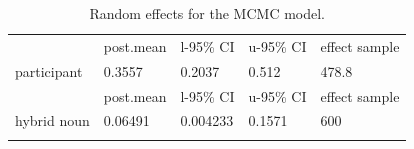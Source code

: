 \documentclass[output=paper,
modfonts,
newtxmath,
hidelinks
]{langscibook}
\begin{document}
\begin{table}[h]
\centering
\footnotesize
\begin{tabularx}{\textwidth}{lXXXX}
\lsptoprule
& post.mean & l-95\% CI & u-95\% CI & effect sample \\
participant & 0.3557    & 0.2037    & 0.512     & 478.8         \\
\midrule
& post.mean & l-95\% CI & u-95\% CI & effect sample \\
hybrid noun & 0.06491   & 0.004233  & 0.1571    & 600           \\
\lspbottomrule
\end{tabularx}
\caption{Random effects for the MCMC model.}\label{14:tab:random-estimates}
\end{table}		
\end{document}
